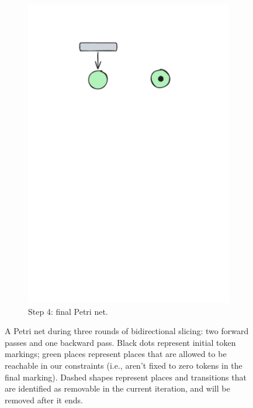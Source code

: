 \begin{figure}[H]
\begin{subfigure}[b][\subfigheight][b]{0.23\textwidth}
		\includegraphics[width=\textwidth]{plots/bidirectional_pruning_step_e_updated_2.pdf}
		\caption{Step 4: final Petri net.}
		\label{fig:step:e}
	\end{subfigure}
	
	\caption{A Petri net during three rounds of bidirectional slicing: two forward passes and one backward pass. Black dots represent initial token markings; green places represent places that are allowed to be reachable in our constraints (i.e., aren't fixed to zero tokens in the final marking). Dashed shapes represent places and transitions that are identified as removable in the current iteration, and will be removed after it ends.}
	\label{fig:bidirectional_pruning}
\end{figure}

